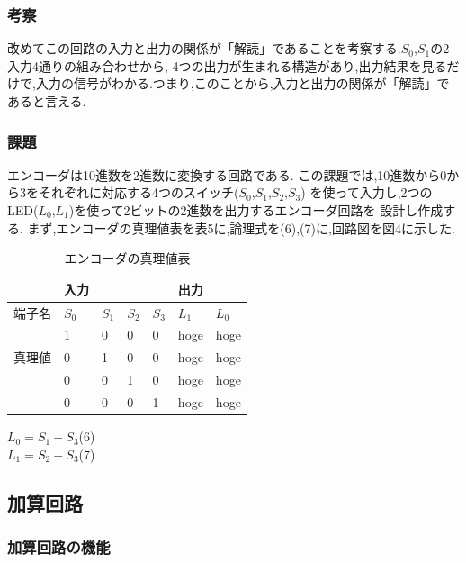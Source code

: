 \documentclass[twocolumn, 10pt,a4j]{jsarticle}
\begin{document}
  \subsubsection{考察}
  改めてこの回路の入力と出力の関係が「解読」であることを考察する.$S_{0}$,$S_{1}$の2入力4通りの組み合わせから,
  4つの出力が生まれる構造があり,出力結果を見るだけで,入力の信号がわかる.つまり,このことから,入力と出力の関係が「解読」であると言える.
  \subsubsection{課題}
  エンコーダは10進数を2進数に変換する回路である.
  この課題では,10進数から0から3をそれぞれに対応する4つのスイッチ($S_{0}$,$S_{1}$,$S_{2}$,$S_{3}$)
  を使って入力し,2つのLED($L_{0}$,$L_{1}$)を使って2ビットの2進数を出力するエンコーダ回路を
  設計し作成する.
  まず,エンコーダの真理値表を表5に,論理式を(6),(7)に,回路図を図4に示した.
  \begin{table}[H]
    \centering
    \caption{エンコーダの真理値表}
    \label{my-label}
      \begin{tabular}{l|ll|llll}
          & 入力      &         &         &         & 出力      &         \\ \hline
      端子名 & $S_{0}$ & $S_{1}$ & $S_{2}$ & $S_{3}$ & $L_{1}$ & $L_{0}$ \\ \hline
          & 1       & 0       & 0       & 0       & hoge    & hoge    \\
      真理値 & 0       & 1       & 0       & 0       & hoge    & hoge    \\
          & 0       & 0       & 1       & 0       & hoge    & hoge    \\
          & 0       & 0       & 0       & 1       & hoge    & hoge   
      \end{tabular}
  \end{table}
  \begin{center}
    $L_{0} = S_{1}+S_{3}$\quad(6) \\
    $L_{1} = S_{2}+S_{3}$\quad(7) \\
  \end{center}
\subsection{加算回路}
  \subsubsection{加算回路の機能}
\end{document}
